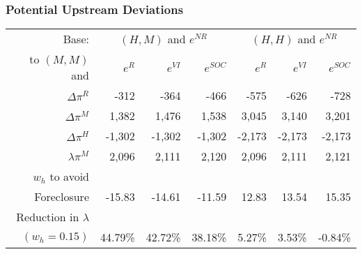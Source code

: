 \documentclass[aspectratio=169]{beamer}
\begin{document}
\begin{frame}[label=moredeviations]
\frametitle{Potential Upstream Deviations}
\footnotesize
\begin{table}[htp]
\begin{center}
\begin{tabular}{| r | r r r | r r r|} 
\hline
\multicolumn{1}{|r|}{Base: }& \multicolumn{3}{c|}{$(H,M)$ and $e^{NR}$ }  & \multicolumn{3}{c|}{ $(H,H)$ and $e^{NR}$} \\ 
\multicolumn{1}{|r|}{to  $(M,M)$ and}& $e^{R}$ & $e^{VI}$ & $e^{SOC}$ & $e^{R}$ & $e^{VI}$ & $e^{SOC}$ \\ \hline
$\Delta \pi^R$ & -312 & -364 & -466 & -575 & -626 & -728 \\
$\Delta \pi^M$ & 1,382 & 1,476 & 1,538 & 3,045 & 3,140 & 3,201 \\
$\Delta \pi^H$ & -1,302 & -1,302 & -1,302 & -2,173 & -2,173 & -2,173 \\
$\lambda \pi^M$ & 2,096 & 2,111 & 2,120& 2,096 & 2,111 & 2,121 \\ \hline
$w_h$ to avoid &&&&&&\\
Foreclosure & -15.83 & -14.61 & -11.59 & 12.83 & 13.54 & 15.35 \\
Reduction in $\lambda$ &&&&&&\\
$(w_h=0.15)$ & 44.79\% & 42.72\% & 38.18\% & 5.27\% & 3.53\% & -0.84\% \\ \hline
\end{tabular}
\end{center}
\label{tab:discount}
\end{table}
\hyperlink{deviations}{}
\end{frame}
\end{document}
